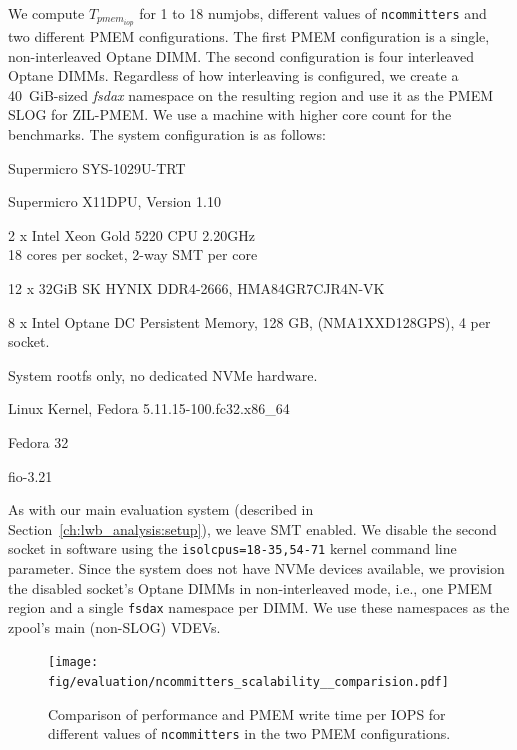 \documentclass[12pt,a4paper,twoside]{book}
\begin{document}
{We compute $T_{pmem_{iop}}$ for 1 to 18 numjobs, different values of \lstinline{ncommitters} and two different PMEM configurations.
The first PMEM configuration is a single, non-interleaved Optane DIMM.
The second configuration is four interleaved Optane DIMMs.
Regardless of how interleaving is configured, we create a 40~GiB-sized \textit{fsdax} namespace on the resulting region and use it as the PMEM SLOG for ZIL-PMEM.
We use a machine with higher core count for the benchmarks.
The system configuration is as follows:
\begin{description}[noitemsep,leftmargin=1.5cm,labelindent=1cm]
    \item[System] Supermicro SYS-1029U-TRT
    \item[Mainboard] Supermicro X11DPU, Version 1.10
    \item[CPU] 2 x Intel Xeon Gold 5220 CPU \@ 2.20GHz \\
        18 cores per socket, 2-way SMT per core
    \item[DRAM] 12 x 32GiB SK HYNIX DDR4-2666, HMA84GR7CJR4N-VK  %
    \item[PMEM] 8 x Intel Optane DC Persistent Memory, 128 GB, (NMA1XXD128GPS), 4 per socket.
    \item[NVMe] System rootfs only, no dedicated NVMe hardware.
    \item[Kernel] Linux Kernel, Fedora 5.11.15-100.fc32.x86\_64
    \item[Userland] Fedora 32
    \item[fio] fio-3.21
\end{description}
As with our main evaluation system (described in Section~\ref{ch:lwb_analysis:setup}), we leave SMT enabled.
We disable the second socket in software using the \lstinline{isolcpus=18-35,54-71} kernel command line parameter.
Since the system does not have NVMe devices available, we provision the disabled socket's Optane DIMMs in non-interleaved mode, i.e., one PMEM region and a single \lstinline{fsdax} namespace per DIMM.
We use these namespaces as the zpool's main (non-SLOG) VDEVs.

\begin{figure}
    \centering
    \texttt{[image: fig/evaluation/ncommitters\_scalability\_\_comparision.pdf]}
    \caption{Comparison of performance and PMEM write time per IOPS for different values of \lstinline{ncommitters} in the two PMEM configurations.}
    \label{fig:eval:ncommitters_scalability:main}
\end{figure}


}
\end{document}
